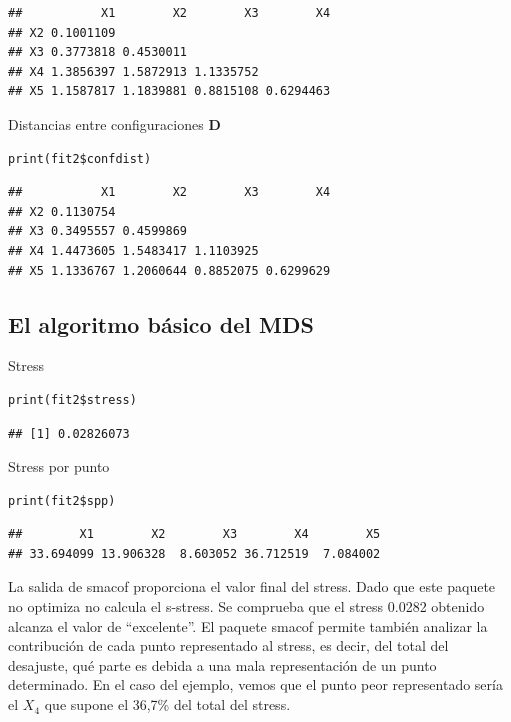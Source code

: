 \documentclass[]{article}
\begin{document}
\begin{verbatim}
##           X1        X2        X3        X4
## X2 0.1001109                              
## X3 0.3773818 0.4530011                    
## X4 1.3856397 1.5872913 1.1335752          
## X5 1.1587817 1.1839881 0.8815108 0.6294463
\end{verbatim}

Distancias entre configuraciones \(\textbf{D}\)

\begin{verbatim}
print(fit2$confdist)
\end{verbatim}

\begin{verbatim}
##           X1        X2        X3        X4
## X2 0.1130754                              
## X3 0.3495557 0.4599869                    
## X4 1.4473605 1.5483417 1.1103925          
## X5 1.1336767 1.2060644 0.8852075 0.6299629
\end{verbatim}

\subsection{El algoritmo básico del
MDS}\label{el-algoritmo-buxe1sico-del-mds-9}

\hypertarget{left}{}
Stress

\begin{verbatim}
print(fit2$stress)
\end{verbatim}

\begin{verbatim}
## [1] 0.02826073
\end{verbatim}

Stress por punto

\begin{verbatim}
print(fit2$spp)
\end{verbatim}

\begin{verbatim}
##        X1        X2        X3        X4        X5 
## 33.694099 13.906328  8.603052 36.712519  7.084002
\end{verbatim}

\hypertarget{right}{}
La salida de smacof proporciona el valor final del stress. Dado que este
paquete no optimiza no calcula el s-stress. Se comprueba que el stress
0.0282 obtenido alcanza el valor de ``excelente''. El paquete smacof
permite también analizar la contribución de cada punto representado al
stress, es decir, del total del desajuste, qué parte es debida a una
mala representación de un punto determinado. En el caso del ejemplo,
vemos que el punto peor representado sería el \(X_4\) que supone el
36,7\% del total del stress.
\end{document}
